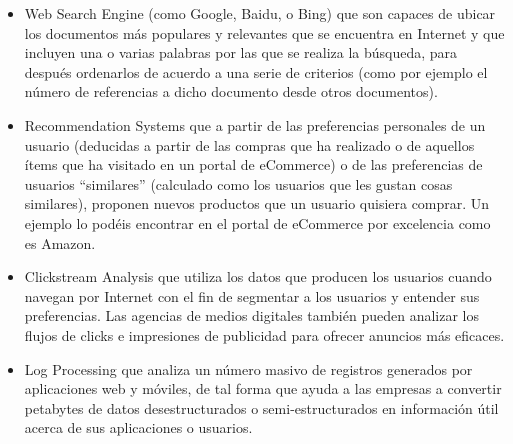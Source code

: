 \begin{itemize}
\item Web Search Engine (como Google, Baidu, o Bing) que son capaces de ubicar los documentos más populares y relevantes que se encuentra en Internet y que incluyen una o varias palabras por las que se realiza la búsqueda, para después ordenarlos de acuerdo a una serie de criterios (como por ejemplo el número de referencias a dicho documento desde otros documentos).
\item  Recommendation Systems que a partir de las preferencias personales de un usuario (deducidas a partir de las compras que ha realizado o de aquellos ítems que ha visitado en un portal de eCommerce) o de las preferencias de usuarios “similares” (calculado como los usuarios que les gustan cosas similares), proponen nuevos productos que un usuario quisiera comprar. Un ejemplo lo podéis encontrar en el portal de eCommerce por excelencia como es Amazon.
\item  Clickstream Analysis que utiliza los datos que producen los usuarios cuando navegan por Internet con el fin de segmentar a los usuarios y entender sus preferencias. Las agencias de medios digitales también pueden analizar los flujos de clicks e impresiones de publicidad para ofrecer anuncios más eficaces.
\item Log Processing que analiza un número masivo de registros generados por aplicaciones web y móviles, de tal forma que ayuda a las empresas a convertir petabytes de datos desestructurados o semi-estructurados en información útil acerca de sus aplicaciones o usuarios.
\end{itemize}
    

    
